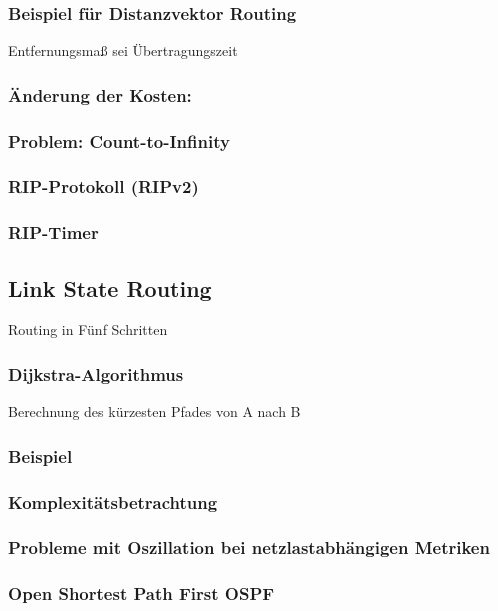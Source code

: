 \subsubsection{Beispiel für Distanzvektor Routing}
Entfernungsmaß sei Übertragungszeit
\subsubsection{Änderung der Kosten:}
\subsubsection{Problem: Count-to-Infinity}
\subsubsection{RIP-Protokoll (RIPv2)}
\subsubsection*{RIP-Timer}

\subsection{Link State Routing}
Routing in Fünf Schritten
\subsubsection{Dijkstra-Algorithmus}
Berechnung des kürzesten Pfades von A nach B
\subsubsection*{Beispiel}
\subsubsection*{Komplexitätsbetrachtung}
\subsubsection*{Probleme mit Oszillation bei netzlastabhängigen Metriken}

\subsubsection{Open Shortest Path First OSPF}

